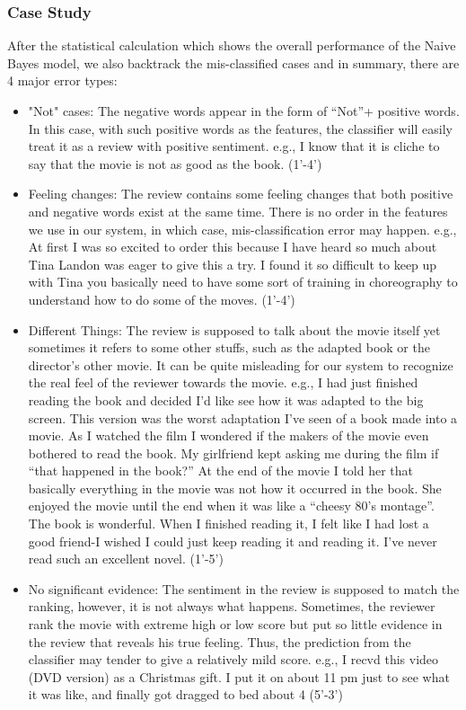 \documentclass[12pt]{article}
\begin{document}
\subsubsection{Case Study}
After the statistical calculation which shows the overall performance of the Naive Bayes model, we also backtrack the mis-classified cases and in summary, there are 4 major error types:
\begin{itemize}
\item "Not" cases: The negative words appear in the form of ``Not''+ positive words. In this case, with such positive words as the features, the classifier will easily treat it as a review with positive sentiment. e.g.,
I know that it is cliche to say that the movie is not as good as the book. (1'-4')
\item Feeling changes: The review contains some feeling changes that both positive and negative words exist at the same time. There is no order in the features we use in our system, in which case, mis-classification error may happen. e.g.,
At first I was so excited to order this because I have heard so much about Tina Landon was eager to give this a try.  I found it so difficult to keep up with Tina you basically need to have some sort of training in choreography to understand how to do some of the moves. (1'-4')
\item Different Things: The review is supposed to talk about the movie itself yet sometimes it refers to some other stuffs, such as the adapted book or the director's other movie. It can be quite misleading for our system to recognize the real feel of the reviewer towards the movie. e.g., I had just finished reading the book and decided I'd like see how it was adapted to the big screen.  This version was the worst adaptation I've seen of a book made into a movie.  As I watched the film I wondered if the makers of the movie even bothered to read the book.  My girlfriend kept asking me during the film if ``that happened in the book?''  At the end of the movie I told her that basically everything in the movie was not how it occurred in the book.  She enjoyed the movie until the end when it was like a ``cheesy 80's montage''.  The book is wonderful.  When I finished reading it, I felt like I had lost a good friend-I wished I could just keep reading it and reading it.  I've never read such an excellent novel. (1'-5')
\item No significant evidence: The sentiment in the review is supposed to match the ranking, however, it is not always what happens. Sometimes, the reviewer rank the movie with extreme high or low score but put so little evidence in the review that reveals his true feeling. Thus, the prediction from the classifier may tender to give a relatively mild score. e.g., I recvd this video (DVD version) as a Christmas gift.  I put it on about 11 pm just to see what it was like, and finally got dragged to bed about 4 (5'-3')
\end{itemize}
\end{document}
